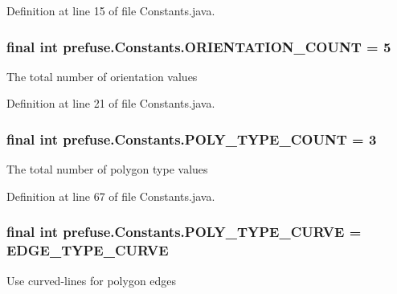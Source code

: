 \-Definition at line 15 of file \-Constants.\-java.

\hypertarget{interfaceprefuse_1_1_constants_a1647b26e3439df6e19bdc0b3b584a2f4}{
\subsubsection[{\-O\-R\-I\-E\-N\-T\-A\-T\-I\-O\-N\-\_\-\-C\-O\-U\-N\-T}]{\setlength{\rightskip}{0pt plus 5cm}final int {\bf prefuse.\-Constants.\-O\-R\-I\-E\-N\-T\-A\-T\-I\-O\-N\-\_\-\-C\-O\-U\-N\-T} = 5}}\label{interfaceprefuse_1_1_constants_a1647b26e3439df6e19bdc0b3b584a2f4}
\-The total number of orientation values 

\-Definition at line 21 of file \-Constants.\-java.

\hypertarget{interfaceprefuse_1_1_constants_a27561744b0c94fbadf7e4e71e1900d60}{
\subsubsection[{\-P\-O\-L\-Y\-\_\-\-T\-Y\-P\-E\-\_\-\-C\-O\-U\-N\-T}]{\setlength{\rightskip}{0pt plus 5cm}final int {\bf prefuse.\-Constants.\-P\-O\-L\-Y\-\_\-\-T\-Y\-P\-E\-\_\-\-C\-O\-U\-N\-T} = 3}}\label{interfaceprefuse_1_1_constants_a27561744b0c94fbadf7e4e71e1900d60}
\-The total number of polygon type values 

\-Definition at line 67 of file \-Constants.\-java.

\hypertarget{interfaceprefuse_1_1_constants_a62fa626bdf70a3f506677f32cf16d827}{
\subsubsection[{\-P\-O\-L\-Y\-\_\-\-T\-Y\-P\-E\-\_\-\-C\-U\-R\-V\-E}]{\setlength{\rightskip}{0pt plus 5cm}final int {\bf prefuse.\-Constants.\-P\-O\-L\-Y\-\_\-\-T\-Y\-P\-E\-\_\-\-C\-U\-R\-V\-E} = {\bf \-E\-D\-G\-E\-\_\-\-T\-Y\-P\-E\-\_\-\-C\-U\-R\-V\-E}}}\label{interfaceprefuse_1_1_constants_a62fa626bdf70a3f506677f32cf16d827}
\-Use curved-\/lines for polygon edges 

